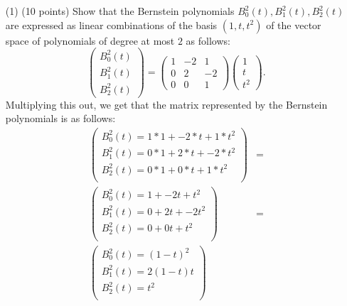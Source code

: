 \documentclass[12pt]{article}
\begin{document}
\begin{itemize}
 \item[(1)](10 points)
Show that the Bernstein polynomials $B_0^2(t), B_1^2(t), B_2^2(t)$
are expressed as linear combinations of the basis
$(1, t, t^2)$ of the vector space of polynomials of degree at most $2$ 
as follows:
\[
\begin{pmatrix}
B_0^2(t)\\
B_1^2(t)\\
B_2^2(t)
\end{pmatrix} = 
\begin{pmatrix}
1 & -2  & 1 \\
0 &  2  & -2 \\
0 &  0  & 1  
\end{pmatrix} 
\begin{pmatrix}
1 \\
t \\
t^2
\end{pmatrix}. 
\]
Multiplying this out, we get that the matrix represented by the Bernstein polynomials is as follows: 
\begin{align*}
    \begin{pmatrix}
    B_0^2(t) = 1 * 1 + -2 * t + 1 * t^2 \\
    B_1^2(t) = 0 * 1 + 2 * t + -2 * t^2 \\
    B_2^2(t) = 0 * 1 + 0 * t + 1 * t^2 \\
    \end{pmatrix} &= \\
    \begin{pmatrix}
    B_0^2(t) = 1 + -2t + t^2 \\
    B_1^2(t) = 0 + 2t + -2t^2 \\
    B_2^2(t) = 0 + 0t + t^2 \\
    \end{pmatrix} &= \\
    \begin{pmatrix}
    B_0^2(t) = (1 - t)^2 \\
    B_1^2(t) = 2(1 - t)t \\
    B_2^2(t) = t^2 \\
    \end{pmatrix}
\end{align*}


\end{itemize}
\end{document}
